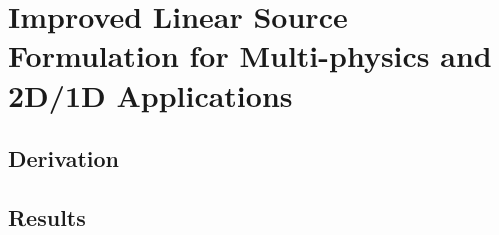 {  \section{Improved Linear Source Formulation for Multi-physics and 2D/1D Applications}{\label{sec:Improved Linear Source Formulation for Multi-physics and 2D/1D Applications}
    \blindtext
    \subsection{Derivation}{\label{ssec:LSMOC:Derivation}
      \blindtext[5]
    }
    \subsection{Results}{\label{ssec:LSMOC:Results}
      \blindtext[5]
    }
  }
}